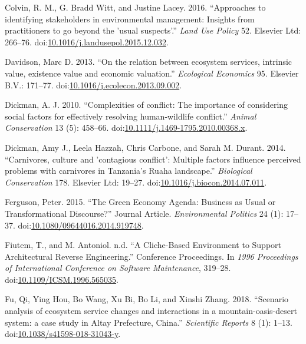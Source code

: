 \documentclass[fleqn,10pt]{wlpeerj} %
\begin{document}
\hypertarget{ref-Colvin2016}{}
Colvin, R. M., G. Bradd Witt, and Justine Lacey. 2016. ``Approaches to
identifying stakeholders in environmental management: Insights from
practitioners to go beyond the 'usual suspects'.'' \emph{Land Use
Policy} 52. Elsevier Ltd: 266--76.
doi:\href{https://doi.org/10.1016/j.landusepol.2015.12.032}{10.1016/j.landusepol.2015.12.032}.

\hypertarget{ref-Davidson2013}{}
Davidson, Marc D. 2013. ``On the relation between ecosystem services,
intrinsic value, existence value and economic valuation.''
\emph{Ecological Economics} 95. Elsevier B.V.: 171--77.
doi:\href{https://doi.org/10.1016/j.ecolecon.2013.09.002}{10.1016/j.ecolecon.2013.09.002}.

\hypertarget{ref-Dickman2010}{}
Dickman, A. J. 2010. ``Complexities of conflict: The importance of
considering social factors for effectively resolving human-wildlife
conflict.'' \emph{Animal Conservation} 13 (5): 458--66.
doi:\href{https://doi.org/10.1111/j.1469-1795.2010.00368.x}{10.1111/j.1469-1795.2010.00368.x}.

\hypertarget{ref-Dickman2014}{}
Dickman, Amy J., Leela Hazzah, Chris Carbone, and Sarah M. Durant. 2014.
``Carnivores, culture and 'contagious conflict': Multiple factors
influence perceived problems with carnivores in Tanzania's Ruaha
landscape.'' \emph{Biological Conservation} 178. Elsevier Ltd: 19--27.
doi:\href{https://doi.org/10.1016/j.biocon.2014.07.011}{10.1016/j.biocon.2014.07.011}.

\hypertarget{ref-Ferguson2015}{}
Ferguson, Peter. 2015. ``The Green Economy Agenda: Business as Usual or
Transformational Discourse?'' Journal Article. \emph{Environmental
Politics} 24 (1): 17--37.
doi:\href{https://doi.org/10.1080/09644016.2014.919748}{10.1080/09644016.2014.919748}.

\hypertarget{ref-Fiutem1996}{}
Fiutem, T., and M. Antoniol. n.d. ``A Cliche-Based Environment to
Support Architectural Reverse Engineering.'' Conference Proceedings. In
\emph{1996 Proceedings of International Conference on Software
Maintenance}, 319--28.
doi:\href{https://doi.org/10.1109/ICSM.1996.565035}{10.1109/ICSM.1996.565035}.

\hypertarget{ref-Fu2018}{}
Fu, Qi, Ying Hou, Bo Wang, Xu Bi, Bo Li, and Xinshi Zhang. 2018.
``Scenario analysis of ecosystem service changes and interactions in a
mountain-oasis-desert system: a case study in Altay Prefecture, China.''
\emph{Scientific Reports} 8 (1): 1--13.
doi:\href{https://doi.org/10.1038/s41598-018-31043-y}{10.1038/s41598-018-31043-y}.
\end{document}
